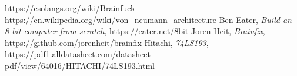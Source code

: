 \begin{thebibliography}{99}
 https://esolangs.org/wiki/Brainfuck
 https://en.wikipedia.org/wiki/von\_neumann\_architecture
 Ben Eater, \emph{Build an 8-bit computer from scratch}, https://eater.net/8bit
 Joren Heit, \emph{Brainfix}, https://github.com/jorenheit/brainfix
 Hitachi, \emph{74LS193}, https://pdf1.alldatasheet.com/datasheet-pdf/view/64016/HITACHI/74LS193.html
\end{thebibliography}
